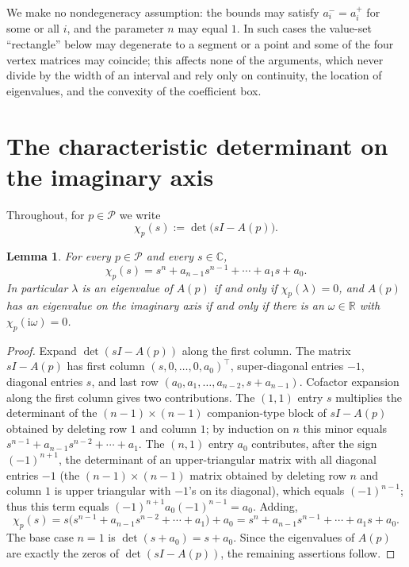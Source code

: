 \documentclass[12pt]{article}
\newtheorem{lemma}{Lemma}
\theoremstyle{definition}
\newcommand{\jj}{\mathrm{i}}
\begin{document}
\smallskip
We make no nondegeneracy assumption: the bounds may satisfy $a_i^-=a_i^+$ for some or all
$i$, and the parameter $n$ may equal $1$. In such cases the value-set ``rectangle'' below
may degenerate to a segment or a point and some of the four vertex matrices may coincide;
this affects none of the arguments, which never divide by the width of an interval and rely
only on continuity, the location of eigenvalues, and the convexity of the coefficient box.

\section{The characteristic determinant on the imaginary axis}

Throughout, for $p\in\mathcal P$ we write
\begin{equation}\label{eq:chidef}
\chi_p(s):=\det\bigl(sI-A(p)\bigr).
\end{equation}

\begin{lemma}\label{lem:det}
For every $p\in\mathcal P$ and every $s\in\mathbb C$,
\[
\chi_p(s)=s^n+a_{n-1}s^{n-1}+\cdots+a_1s+a_0 .
\]
In particular $\lambda$ is an eigenvalue of $A(p)$ if and only if $\chi_p(\lambda)=0$, and
$A(p)$ has an eigenvalue on the imaginary axis if and only if there is an
$\omega\in\mathbb R$ with $\chi_p(\jj\omega)=0$.
\end{lemma}

\begin{proof}
Expand $\det(sI-A(p))$ along the first column. The matrix $sI-A(p)$ has first column
$(s,0,\dots,0,a_0)^{\!\top}$, super-diagonal entries $-1$, diagonal entries $s$, and last
row $(a_0,a_1,\dots,a_{n-2},s+a_{n-1})$. Cofactor expansion along the first column gives
two contributions. The $(1,1)$ entry $s$ multiplies the determinant of the
$(n-1)\times(n-1)$ companion-type block of $sI-A(p)$ obtained by deleting row $1$ and
column $1$; by induction on $n$ this minor equals
$s^{n-1}+a_{n-1}s^{n-2}+\cdots+a_1$. The $(n,1)$ entry $a_0$ contributes, after the sign
$(-1)^{n+1}$, the determinant of an upper-triangular matrix with all diagonal entries
$-1$ (the $(n-1)\times(n-1)$ matrix obtained by deleting row $n$ and column $1$ is upper
triangular with $-1$'s on its diagonal), which equals $(-1)^{n-1}$; thus this term equals
$(-1)^{n+1}a_0(-1)^{n-1}=a_0$. Adding,
\[
\chi_p(s)=s\bigl(s^{n-1}+a_{n-1}s^{n-2}+\cdots+a_1\bigr)+a_0
=s^n+a_{n-1}s^{n-1}+\cdots+a_1s+a_0 .
\]
The base case $n=1$ is $\det(s+a_0)=s+a_0$. Since the eigenvalues of $A(p)$ are exactly
the zeros of $\det(sI-A(p))$, the remaining assertions follow.
\end{proof}
\end{document}
